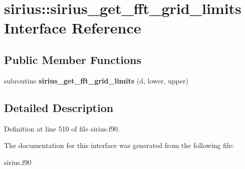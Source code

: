 \hypertarget{interfacesirius_1_1sirius__get__fft__grid__limits}{}\section{sirius\+:\+:sirius\+\_\+get\+\_\+fft\+\_\+grid\+\_\+limits Interface Reference}
\label{interfacesirius_1_1sirius__get__fft__grid__limits}
\subsection*{Public Member Functions}
\begin{DoxyCompactItemize}
\item 
\hypertarget{interfacesirius_1_1sirius__get__fft__grid__limits_a82d5080dfeef5f2f12649afa404ed984}{}subroutine {\bfseries sirius\+\_\+get\+\_\+fft\+\_\+grid\+\_\+limits} (d, lower, upper)\label{interfacesirius_1_1sirius__get__fft__grid__limits_a82d5080dfeef5f2f12649afa404ed984}

\end{DoxyCompactItemize}


\subsection{Detailed Description}


Definition at line 510 of file sirius.\+f90.



The documentation for this interface was generated from the following file\+:\begin{DoxyCompactItemize}
\item 
sirius.\+f90\end{DoxyCompactItemize}

